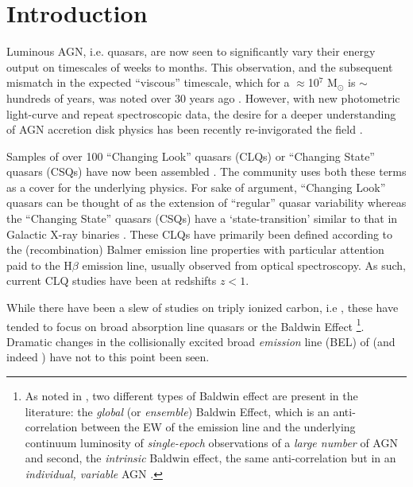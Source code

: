 \documentclass[a4paper,fleqn,usenatbib]{mnras}
\begin{document}
\section{Introduction}
Luminous AGN, i.e. quasars, are now seen to significantly vary their
energy output on timescales of weeks to months.  This observation, and
the subsequent mismatch in the expected ``viscous'' timescale, which
for a $\approx$10$^{7}$ M$_{\odot}$ is $\sim$hundreds of years, was
noted over 30 years ago \citep[e.g.][]{Alloin1985}. However, with new
photometric light-curve and repeat spectroscopic data, the desire for
a deeper understanding of AGN accretion disk physics has been recently
re-invigorated the field \citep[e.g.][]{Lawrence2018, Antonucci2018}.

Samples of over 100 ``Changing Look'' quasars (CLQs) or ``Changing
State'' quasars (CSQs) have now been assembled
\citep[e.g.][]{MacLeod2019, Graham2019}. The community uses both these
terms as a cover for the underlying physics. For sake of argument,
``Changing Look'' quasars can be thought of as the extension of
``regular'' quasar variability \citep[e.g.][]{MacLeod2012} whereas the
``Changing State'' quasars (CSQs) have a `state-transition' similar to
that in Galactic X-ray binaries \citep[e.g][]{NodaDone2018, Ruan2019}.
These CLQs have primarily been defined according to the
(recombination) Balmer emission line properties with particular
attention paid to the H$\beta$ emission line, usually observed from
optical spectroscopy.  As such, current CLQ studies have been at
redshifts $z<1$.

While there have been a slew of studies on triply ionized carbon, i.e
\civ, these have tended to focus on broad absorption line quasars
\citep[BAL QSOs; see e.g. Table 1][]{Hemler2019} or the Baldwin Effect
\citep[BEff; e.g. ][]{Baldwin1977, Bian2012, Jensen2016,
Hamann2017}\footnote{As noted in \citet{Rakic2017}, two different
types of Baldwin effect are present in the literature: the {\it
global} (or {\it ensemble}) Baldwin Effect, which is an
anti-correlation between the EW of the emission line and the
underlying continuum luminosity of {\it single-epoch} observations of
a {\it large number} of AGN and second, the {\it intrinsic} Baldwin
effect, the same anti-correlation but in an {\it individual, variable}
AGN \citep{PoggePeterson1992}.}.  Dramatic changes in the
collisionally excited broad {\it emission} line (BEL) of \civ (and
indeed \ciii) have not to this point been seen.
\end{document}
